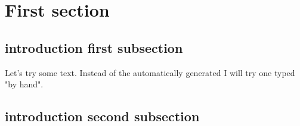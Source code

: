 \documentclass[crop=false]{standalone}
\begin{document}
\section{First section}

\subsection{introduction first subsection}
Let's try some text. Instead of the automatically generated
I will try one typed "by hand".

\subsection{introduction second subsection}

\blindtext
\end{document}
